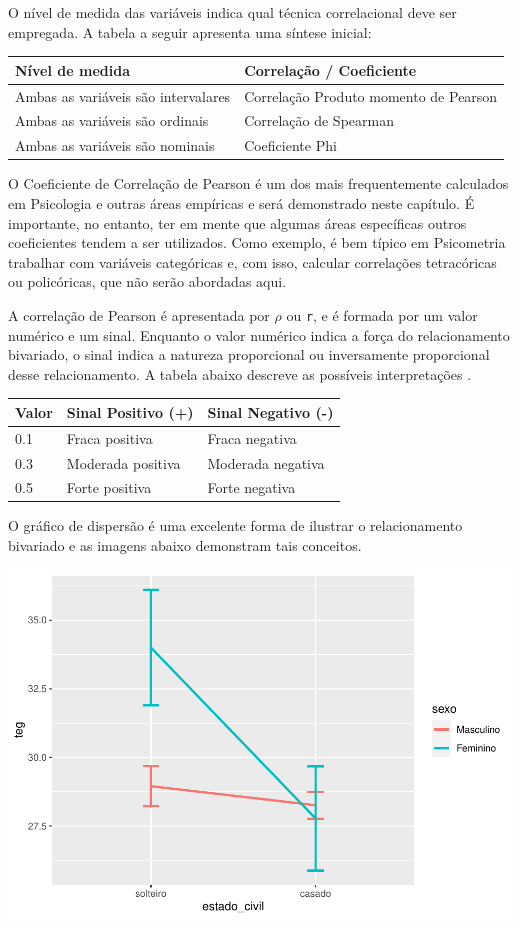 \documentclass[
]{book}
\begin{document}
O nível de medida das variáveis indica qual técnica correlacional deve ser empregada. A tabela a seguir apresenta uma síntese inicial:

\begin{longtable}[]{@{}ll@{}}
\toprule
Nível de medida & Correlação / Coeficiente\tabularnewline
\midrule
\endhead
Ambas as variáveis são intervalares & Correlação Produto momento de Pearson\tabularnewline
Ambas as variáveis são ordinais & Correlação de Spearman\tabularnewline
Ambas as variáveis são nominais & Coeficiente Phi\tabularnewline
\bottomrule
\end{longtable}

O Coeficiente de Correlação de Pearson é um dos mais frequentemente calculados em Psicologia e outras áreas empíricas e será demonstrado neste capítulo. É importante, no entanto, ter em mente que algumas áreas específicas outros coeficientes tendem a ser utilizados. Como exemplo, é bem típico em Psicometria trabalhar com variáveis categóricas e, com isso, calcular correlações tetracóricas ou policóricas, que não serão abordadas aqui.

A correlação de Pearson é apresentada por \(\rho\) ou \texttt{r}, e é formada por um valor numérico e um sinal. Enquanto o valor numérico indica a força do relacionamento bivariado, o sinal indica a natureza proporcional ou inversamente proporcional desse relacionamento. A tabela abaixo descreve as possíveis interpretações \citep{Cohen1988}.

\begin{longtable}[]{@{}lll@{}}
\toprule
Valor & Sinal Positivo (+) & Sinal Negativo (-)\tabularnewline
\midrule
\endhead
0.1 & Fraca positiva & Fraca negativa\tabularnewline
0.3 & Moderada positiva & Moderada negativa\tabularnewline
0.5 & Forte positiva & Forte negativa\tabularnewline
\bottomrule
\end{longtable}

O gráfico de dispersão é uma excelente forma de ilustrar o relacionamento bivariado e as imagens abaixo demonstram tais conceitos.

\begin{center}\includegraphics{gitbook-demo_files/figure-latex/unnamed-chunk-71-1} \end{center}
\end{document}
